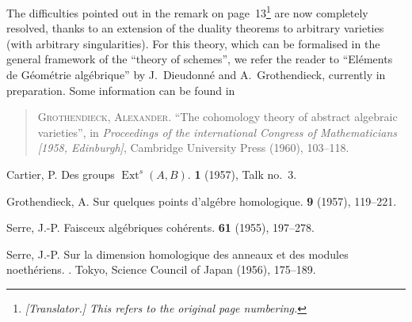 \documentclass{article}
\theoremstyle{plain}
\theoremstyle{definition}
\DeclareMathOperator{\Ext}{Ext}
\begin{document}
The difficulties pointed out in the remark on page~13\footnote{\emph{[Translator.] This refers to the original page numbering.}} are now completely resolved, thanks to an extension of the duality theorems to arbitrary varieties (with arbitrary singularities).
For this theory, which can be formalised in the general framework of the ``theory of schemes'', we refer the reader to ``El\'{e}ments de G\'{e}om\'{e}trie alg\'{e}brique'' by J.~Dieudonn\'{e} and A.~Grothendieck, currently in preparation.
Some information can be found in

\begin{quote}
  \textsc{Grothendieck, Alexander.} ``The cohomology theory of abstract algebraic varieties'', in \emph{Proceedings of the international Congress of Mathematicians [1958, Edinburgh]}, Cambridge University Press (1960), 103--118.
\end{quote}

\noindent[April, 1959]



\nocite{*}
% 
\begin{thebibliography}{4}

  {\sc Cartier, P.}
  \newblock Des groups $\Ext^s(A,B)$.
   \textbf{1} (1957), Talk no.~3.

  {\sc Grothendieck, A.}
  \newblock Sur quelques points d'alg\'{e}bre homologique.
   {\bf 9} (1957), 119--221.

  {\sc Serre, J.-P.}
  \newblock Faisceux alg\'{e}briques coh\'{e}rents.
   {\bf 61} (1955), 197--278.

  {\sc Serre, J.-P.}
  \newblock Sur la dimension homologique des anneaux et des modules noeth\'{e}riens.
  .
  \newblock Tokyo, Science Council of Japan (1956), 175--189.

\end{thebibliography}
\end{document}
